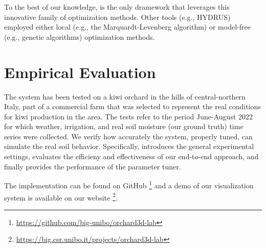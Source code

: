 To the best of our knowledge, \olab{} is the only dramework that leverages this innovative family of optimization methods.
Other tools (e.g., HYDRUS) employed either local (e.g., the Marquardt-Levenberg algorithm) or model-free (e.g., genetic algorithms) optimization methods. 

\section{Empirical Evaluation}
The system has been tested on a kiwi orchard in the hills of central-northern Italy, part of a commercial farm that was selected to represent the real conditions for kiwi production in the area.
The tests refer to the period June-August 2022 for which weather, irrigation, and real soil moisture (our ground truth) time series were collected.
We verify how accurately the system, properly tuned, can simulate the real soil behavior.
Specifically,  introduces the general experimental settings,  evaluates the efficieny and effectiveness of our end-to-end approach, and finally  provides the performance of the parameter tuner.

The implementation can be found on GitHub \footnote{\url{https://github.com/big-unibo/orchard3d-lab}} and a demo of our \olab{} visualization system is available on our website \footnote{\url{https://big.csr.unibo.it/projects/orchard3d-lab}}.


